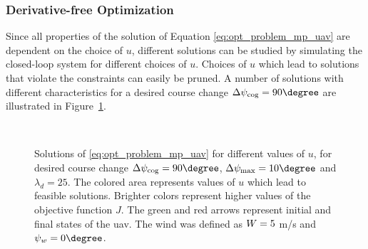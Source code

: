 \subsubsection{Derivative-free Optimization}
Since all properties of the solution of Equation \eqref{eq:opt_problem_mp_uav} are dependent on the choice of $u$, different solutions can be studied by simulating
the closed-loop system for different choices of $u$. Choices of $u$ which lead to solutions that violate the constraints 
can easily be pruned. A number of solutions with different characteristics for a desired course change $\Delta\cog=90\degree$ are illustrated in Figure~\ref{fig:opt_contour}. 

\begin{figure}
    \\
    \caption{Solutions of \eqref{eq:opt_problem_mp_uav} for different values of $u$, for desired course change $\Delta\cog=90\degree$, $\Delta \psi_{\text{max}}=10\degree$ and $\lambda_d=25$. The colored area represents values of $u$ which 
    lead to feasible solutions. Brighter colors represent higher values of the objective function $J$. The green and red arrows represent initial and final states of the \ac{uav}. The wind was defined as $W=5$ m/s and $\winddir=0\degree$.}
    \label{fig:opt_contour}
\end{figure}

